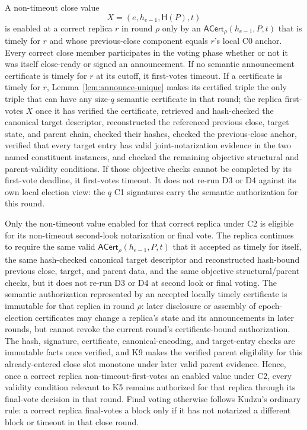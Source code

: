 \documentclass[11pt]{article}
\theoremstyle{definition}
\theoremstyle{remark}
\newcommand{\hash}{\mathsf{H}}
\newcommand{\ACert}{\mathsf{ACert}}
\begin{document}
\begin{description}[leftmargin=2.4em,labelindent=0em]
A non-timeout close value
\[
  X=(e,h_{e-1},\hash(P),t)
\]
is enabled at a correct replica $r$ in round $\rho$ only by an $\ACert_\rho(h_{e-1},P,t)$ that is timely for $r$ and whose previous-close component equals $r$'s local C0 anchor. Every correct close member participates in the voting phase whether or not it was itself close-ready or signed an announcement. If no semantic announcement certificate is timely for $r$ at its cutoff, it first-votes timeout. If a certificate is timely for $r$, Lemma~\ref{lem:announce-unique} makes its certified triple the only triple that can have any size-$q$ semantic certificate in that round; the replica first-votes $X$ once it has verified the certificate, retrieved and hash-checked the canonical target descriptor, reconstructed the referenced previous close, target state, and parent chain, checked their hashes, checked the previous-close anchor, verified that every target entry has valid joint-notarization evidence in the two named constituent instances, and checked the remaining objective structural and parent-validity conditions. If those objective checks cannot be completed by its first-vote deadline, it first-votes timeout. It does not re-run D3 or D4 against its own local election view: the $q$ C1 signatures carry the semantic authorization for this round.
\item[C3 (certificate-bound later voting).]
Only the non-timeout value enabled for that correct replica under C2 is eligible for its non-timeout second-look notarization or final vote. The replica continues to require the same valid $\ACert_\rho(h_{e-1},P,t)$ that it accepted as timely for itself, the same hash-checked canonical target descriptor and reconstructed hash-bound previous close, target, and parent data, and the same objective structural/parent checks, but it does not re-run D3 or D4 at second look or final voting. The semantic authorization represented by an accepted locally timely certificate is immutable for that replica in round $\rho$: later disclosure or assembly of epoch-election certificates may change a replica's state and its announcements in later rounds, but cannot revoke the current round's certificate-bound authorization. The hash, signature, certificate, canonical-encoding, and target-entry checks are immutable facts once verified, and K9 makes the verified parent eligibility for this already-entered close slot monotone under later valid parent evidence. Hence, once a correct replica non-timeout-first-votes an enabled value under C2, every validity condition relevant to K5 remains authorized for that replica through its final-vote decision in that round. Final voting otherwise follows Kudzu's ordinary rule: a correct replica final-votes a block only if it has not notarized a different block or timeout in that close round.

\end{description}
\end{document}
